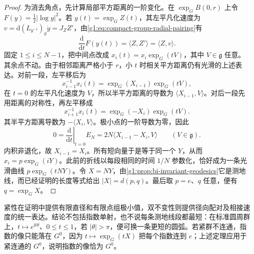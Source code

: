 \begin{proof}
	为消去角点，先计算局部平方距离的一阶变化。在 \(\exp_GB(0,r)\) 上令 \(F(y)=\tfrac12|\log y|^2\)。若 \(y(t)=\exp_GZ(t)\)，其左平凡化速度为 \(v=\mathrm{d}(L_{y^{-1}})_y\dot y=J_ZZ'\)，由\eqref{g1:eq:compact-group-radial-pairing}有
	\begin{equation}\label{g1:eq:compact-group-distance-variation}
		\frac{\mathrm{d}}{\mathrm{d}t}F(y(t))
		=\langle Z,Z'\rangle=\langle Z,v\rangle.
	\end{equation}
	固定 \(1\le i\le N-1\)，把中间点改成 \(x_i(t)=x_i\exp_G(tV)\)，其中 \(V\in\mathfrak g\) 任意。其余点不动。由于相邻距离严格小于 \(r\)，小 \(t\) 时相关平方距离仍有光滑的上述表达。对前一段，左平移后为
	\[
		x_{i-1}^{-1}x_i(t)=\exp_G(X_{i-1})\exp_G(tV),
	\]
	在 \(t=0\) 的左平凡化速度为 \(V\)，所以半平方距离的导数为 \(\langle X_{i-1},V\rangle\)。对后一段先用距离的对称性，再左平移成
	\[
		x_{i+1}^{-1}x_i(t)=\exp_G(-X_i)\exp_G(tV).
	\]
	其半平方距离导数为 \(-\langle X_i,V\rangle\)。极小点的一阶导数为零，因此
	\[
		0=\left.\frac{\mathrm{d}}{\mathrm{d}t}\right|_{t=0}E_N
		=2N\langle X_{i-1}-X_i,V\rangle
		\qquad(V\in\mathfrak g).
	\]
	内积非退化，故 \(X_{i-1}=X_i\)。所有短向量于是等于同一个 \(Y\)，从而 \(x_i=p\exp_G(iY)\)。此前的折线以每段相同的时间 \(1/N\) 参数化，恰好成为一条光滑曲线 \(p\exp_G(tNY)\)。令 \(X=NY\)，由\cref{g1:prop:bi-invariant-geodesics}它是测地线，而已经证明的长度等式给出 \(|X|=d(p,q)\)。最后取 \(p=e\)、\(q\) 任意，便有 \(q=\exp_GX\)。
\end{proof}

\begin{remark}\label{g1:rem:compact-exponential-boundaries}
	紧性在证明中提供有限直径和有限点组极小值，双不变性则提供径向配对及相接速度的统一表达。结论不包括指数单射，也不说每条测地线段都最短：在标准圆周群上，\(t\mapsto e^{\mathrm{i}t\theta}\)、\(0\le t\le1\)，若 \(|\theta|>\pi\)，便可换一条更短的圆弧。若紧群不连通，指数的像只能落在 \(G^0\)，因为 \(t\mapsto\exp_G(tX)\) 把每个指数连到 \(e\)；上述定理应用于紧连通的 \(G^0\)，说明指数的像恰为 \(G^0\)。
\end{remark}
